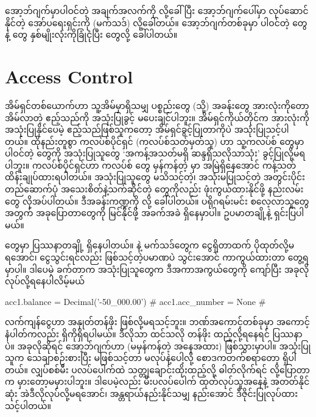 \begin{mytcbox}
\betweentcboxpar
\noindent အော့ဘ်ဂျက်မှာပါဝင်တဲ့ အချက်အလက်ကို  လို့ခေါ်ပြီး အော့ဘ်ဂျက်ပေါ်မှာ လုပ်ဆောင်နိုင်တဲ့ အော်ပရေးရှင်းကို  (မက်သဒ်) လို့ခေါ်တယ်။ အော့ဘ်ဂျက်တစ်ခုမှာ ပါဝင်တဲ့  တွေနဲ့  တွေ နှစ်မျိုးလုံးကိုခြုံငုံပြီး  တွေလို့ ခေါ်ပါတယ်။ 
\end{mytcbox}




\section{Access Control}
အိမ်ရှင်တစ်ယောက်ဟာ သူ့အိမ်မှာရှိသမျှ ပစ္စည်းတွေ (သို့) အခန်းတွေ အားလုံးကိုတော့ အိမ်လာတဲ့ ဧည့်သည်ကို အသုံးပြုခွင့် မပေးချင်ပါဘူး။ အိမ်ရှင်ကိုယ်တိုင်က အားလုံးကို အသုံးပြုနိုင်ပေမဲ့ ဧည့်သည်ဖြစ်သူကတော့ အိမ်ရှင်ခွင့်ပြုတာကိုပဲ အသုံးပြုသင့်ပါတယ်။ ထိုနည်းတူစွာ ကလပ်စ်ပိုင်ရှင် (ကလပ်စ်သတ်မှတ်သူ) ဟာ သူ့ကလပ်စ်  တွေမှာ ပါဝင်တဲ့  တွေကို အသုံးပြုသူတွေ ‘အကန့်အသတ်မရှိ ဆန္ဒရှိသလိုသာသုံး’ ခွင့်ပြုလို့မရပါဘူး။ ကလပ်စ်ပိုင်ရှင်ဟာ ကလပ်စ်  တွေ မှန်ကန်တဲ့  မှာ အမြဲရှိနေအောင် ကန့်သတ် ထိန်းချုပ်ထားရပါတယ်။ အသုံးပြုသူတွေ မသိသင့်တဲ့၊ အသုံးမပြုသင့်တဲ့ အတွင်းပိုင်းတည်ဆောက်ပုံ အသေးစိတ်နဲ့သက်ဆိုင်တဲ့  တွေကိုလည်း ဖုံးကွယ်ထားနိုင်ဖို့ နည်းလမ်းတွေ လိုအပ်ပါတယ်။ ဒီအခန်းကဏ္ဍကို  လို့ ခေါ်ပါတယ်။ ပရိုဂရမ်းမင်း စလေ့လာသူတွေအတွက် အခုပြောတာတွေကို မြင်နိုင်ဖို့ အခက်အခဲ ရှိနေမှာပါ။ ဥပမာတချို့နဲ့ ရှင်းပြပါမယ်။

  တွေမှာ ပြဿနာတချို့ ရှိနေပါတယ်။  နဲ့  မက်သဒ်တွေက ငွေရှိတာထက် ပိုထုတ်လို့မရအောင်၊ ငွေသွင်းရင်လည်း ဖြစ်သင့်တဲ့ပမာဏပဲ သွင်းအောင် ကာကွယ်ထားတာ တွေ့ရမှာပါ။ ဒါပေမဲ့ ခက်တာက အသုံးပြုသူတွေက ဒီအကာအကွယ်တွေကို ကျော်ပြီး အခုလို လုပ်လို့ရနေပါလိမ့်မယ်
%
\begin{py}
acc1.balance = Decimal('-50_000.00')    # 
acc1.acc_number = None                  #
\end{py}
%
လက်ကျန်ငွေဟာ အနှုတ်တန်ဖိုး ဖြစ်လို့မရသင့်ဘူး။ ဘဏ်အကောင့်တစ်ခုမှာ အကောင့်နံပါတ်ကလည်း ရှိကိုရှိရပါမယ်။  ဒီလိုသာ ထင်သလို တန်ဖိုး ထည့်လို့ရနေရင် ပြဿနာပဲ။ အခုလိုဆိုရင်  အော့ဘ်ဂျက်ဟာ  (မမှန်ကန်တဲ့ အနေအထား) ဖြစ်သွားမှာပါ။ အသုံးပြုသူက သေချာစဉ်းစားပြီး မဖြစ်သင့်တာ မလုပ်နဲ့ပေါ့လို့ စောဒကတက်စရာတော့ ရှိပါတယ်။ လျှပ်စစ်မီး ပလပ်ပေါက်ထဲ သတ္တုချောင်းထိုးထည့်လို့ ဓါတ်လိုက်ရင်  လို့ပြောတာက မှားတော့မမှားပါဘူး။ ဒါပေမဲ့လည်း မီးပလပ်ပေါက် ထုတ်လုပ်သူအနေနဲ့ အတတ်နိုင်ဆုံး အဲဒီလိုလုပ်လို့မရအောင်၊ အန္တရာယ်နည်းနိုင်သမျှ နည်းအောင် ဒီဇိုင်းပြုလုပ်ထားသင့်ပါတယ်။

